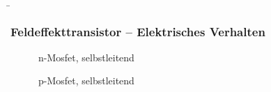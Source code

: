 \begin{frame}
    \b{ \frametitle{Feldeffekttransistor -- Elektrisches Verhalten}
        \begin{table}[H]
            \begin{figure}[H]
                \begin{minipage}[c]{0.1\textwidth}
                    \centering
                    n-Mosfet, \newline
                    selbstleitend
                \end{minipage}
                \begin{minipage}[c]{0.2\textwidth}
                    \centering
                    
                \end{minipage}
                \begin{minipage}[c]{0.33\textwidth}
                    \centering
                    
                \end{minipage}
                \begin{minipage}[c]{0.33\textwidth}
                    \centering
                    
                \end{minipage}
            \end{figure}
            \begin{figure}[H]
                \begin{minipage}[c]{0.1\textwidth}
                    \centering
                    p-Mosfet, \newline
                    selbstleitend
                \end{minipage}
                \begin{minipage}[c]{0.2\textwidth}
                    \centering
                    
                \end{minipage}
                \begin{minipage}[c]{0.33\textwidth}
                    \centering
                    
                \end{minipage}
                \begin{minipage}[c]{0.33\textwidth}

\end{minipage}
\end{figure}
\end{table}}
\end{frame}
